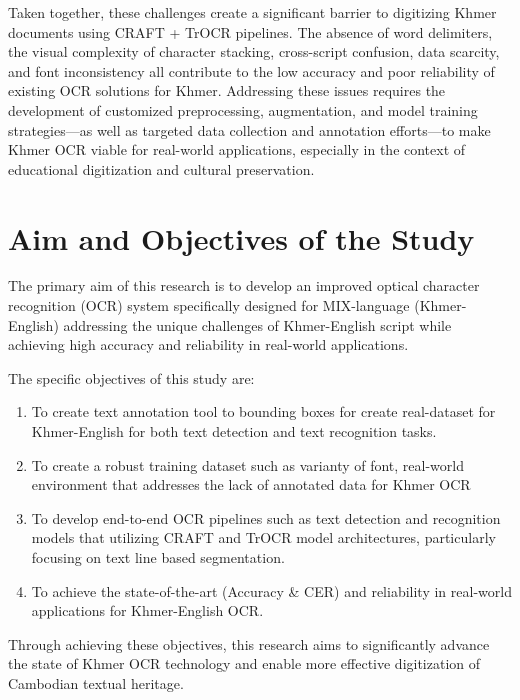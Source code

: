 Taken together, these challenges create a significant barrier to digitizing Khmer documents using CRAFT + TrOCR pipelines. The absence of word delimiters, the visual complexity of character stacking, cross-script confusion, data scarcity, and font inconsistency all contribute to the low accuracy and poor reliability of existing OCR solutions for Khmer. Addressing these issues requires the development of customized preprocessing, augmentation, and model training strategies—as well as targeted data collection and annotation efforts—to make Khmer OCR viable for real-world applications, especially in the context of educational digitization and cultural preservation.




\section{Aim and Objectives of the Study}
\label{sec:objectives}

The primary aim of this research is to develop an improved optical character recognition (OCR) system specifically designed for MIX-language (Khmer-English) addressing the unique challenges of Khmer-English script while achieving high accuracy and reliability in real-world applications.

The specific objectives of this study are:

\begin{enumerate}
    \item To create text annotation tool to bounding boxes for create real-dataset for Khmer-English for both text detection and text recognition tasks.
    \item To create a robust training dataset such as varianty of font, real-world environment that addresses the lack of annotated data for Khmer OCR
    \item To develop end-to-end OCR pipelines such as text detection and recognition models that utilizing CRAFT and TrOCR model architectures, particularly focusing on text line based segmentation.
    \item To achieve the state-of-the-art (Accuracy \& CER) and reliability in real-world applications for Khmer-English OCR.
\end{enumerate}

Through achieving these objectives, this research aims to significantly advance the state of Khmer OCR technology and enable more effective digitization of Cambodian textual heritage.

